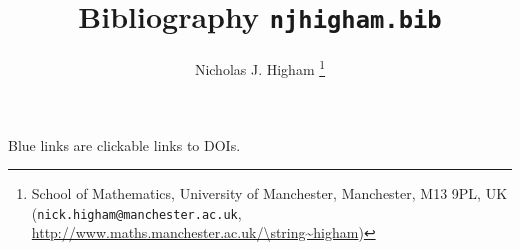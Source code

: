 \documentclass[12pt]{article}
\title{Bibliography \texttt{njhigham.bib}}
\author{Nicholas J. Higham%
        \thanks{%
                School of Mathematics,
                University of Manchester,
                Manchester, M13 9PL, UK 
                (\texttt{nick.higham@manchester.ac.uk},
                \url{http://www.maths.manchester.ac.uk/\string~higham})
               }
}
\date{}
\begin{document}
\maketitle
Blue links are clickable links to DOIs.


\nocite{*}

% 

% 

\end{document}
